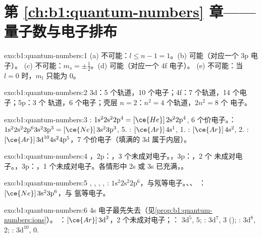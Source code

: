 \section*{第 \ref{ch:b1:quantum-numbers} 章——量子数与电子排布}

\begin{solution}{exo:b1:quantum-numbers:1}
(a) 不可能：$l \le n - 1 = 1$。(b) 可能（对应一个 3p 电子）。
(c) 不可能：$m_s = \pm\tfrac12$。(d) 可能（对应一个 4f 电子）。
(e) 不可能：当 $l = 0$ 时，$m_l$ 只能为 0。
\end{solution}

\begin{solution}{exo:b1:quantum-numbers:2}
3d：5 个轨道，10 个电子；4f：7 个轨道，14 个电子；5p：3 个
轨道，6 个电子；壳层 $n = 2$：$n^2 = 4$ 个轨道，$2n^2 = 8$ 个
电子。
\end{solution}

\begin{solution}{exo:b1:quantum-numbers:3}
: $1\text{s}^2 2\text{s}^2 2\text{p}^4 = [\ce{He}]\,2\text{s}^2 2\text{p}^4$,
6 个价电子。：$1\text{s}^2 2\text{s}^2 2\text{p}^6 3\text{s}^2
3\text{p}^3 = [\ce{Ne}]\,3\text{s}^2 3\text{p}^3$, 5. : $[\ce{Ar}]\,4\text{s}^1$,
1. : $[\ce{Ar}]\,4\text{s}^2$, 2. : $[\ce{Ar}]\,3\text{d}^{10}
4\text{s}^2 4\text{p}^5$，7 个价电子（填满的 3d 属于内层）。
\end{solution}

\begin{solution}{exo:b1:quantum-numbers:4}
，2p：，3 个未成对电子。，3p：，2 个
未成对电子。，3p：，1 个未成对电子。各情形中 2s 或
3s 已充满，。
\end{solution}

\begin{solution}{exo:b1:quantum-numbers:5}
, , , , : $1\text{s}^2
2\text{s}^2 2\text{p}^6$，与氖等电子。、、
：$[\ce{Ne}]\,3\text{s}^2 3\text{p}^6$，与
氩等电子。
\end{solution}

\begin{solution}{exo:b1:quantum-numbers:6}
4s 电子最先失去（见\cref{prop:b1:quantum-numbers:ions}）。
：$[\ce{Ar}]\,3\text{d}^2$，2 个未成对电子；：
$3\text{d}^5$, 5; : $3\text{d}^7$, 3 ();
: $3\text{d}^8$, 2; : $3\text{d}^{10}$, 0.
\end{solution}

